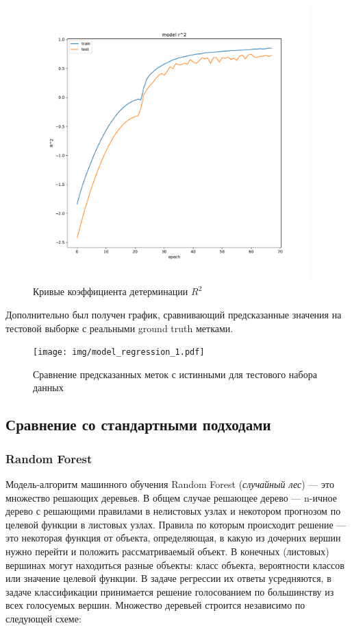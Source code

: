 \documentclass[14pt]{extarticle}
\begin{document}
\begin{figure}[h]
	\centering
	\includegraphics[width=0.95\textwidth]{img/model_r2.pdf}
	\caption{Кривые коэффициента детерминации $R^2$}
	\label{fig:test_r2}
\end{figure}

\newpage

Дополнительно был получен график, сравнивающий предсказанные значения на тестовой выборке с реальными ground truth метками.

\begin{figure}[h]
	\centering
	\texttt{[image: img/model\_regression\_1.pdf]}
	\caption{Сравнение предсказанных меток с истинными для тестового набора данных}
	\label{fig:test_regression}
\end{figure}


\subsection{Сравнение со стандартными подходами}

\subsubsection{Random Forest}

Модель-алгоритм машинного обучения Random Forest ({\it случайный лес}) --- это множество решающих деревьев. В общем случае решающее дерево --- n-ичное дерево с решающими правилами в нелистовых узлах и некотором прогнозом по целевой функции в листовых узлах. Правила по которым происходит решение --- это некоторая функция от объекта, определяющая, в какую из дочерних вершин нужно перейти и положить рассматриваемый объект. В конечных (листовых) вершинах могут находиться разные объекты: класс объекта, вероятности классов или значение целевой функции. В задаче регрессии их ответы усредняются, в задаче классификации принимается решение голосованием по большинству из всех голосуемых вершин. Множество деревьей строится независимо по следующей схеме:
\end{document}
